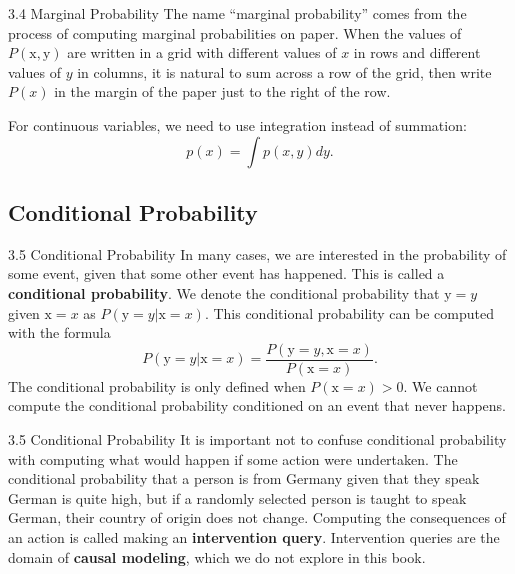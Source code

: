 \begin{frame}{3.4 Marginal Probability}
    \justifying
    The name ``marginal probability'' comes from the process of computing marginal probabilities on paper. When the values of $P(\mathrm{x}, \mathrm{y})$ are written in a grid with different values of $x$ in rows and different values of $y$ in columns, it is natural to sum across a row of the grid, then write $P(x)$ in the margin of the paper just to the right of the row.
    
    For continuous variables, we need to use integration instead of summation:
    \begin{equation}
        p(x) = \int p(x, y)dy.
        \label{eq:3_4}
    \end{equation}
\end{frame}

\subsection{Conditional Probability}
\begin{frame}{3.5 Conditional Probability}
    \justifying
    In many cases, we are interested in the probability of some event, given that some other event has happened. This is called a \textbf{conditional probability}. We denote the conditional probability that $\mathrm{y} = y$ given $\mathrm{x} = x$ as $P(\mathrm{y} = y | \mathrm{x} = x)$. This conditional probability can be computed with the formula
    \begin{equation}
        P(\mathrm{y} = y | \mathrm{x} = x) = \frac{P(\mathrm{y} = y, \mathrm{x} = x)}{P(\mathrm{x} = x)}.
        \label{eq:3_5}
    \end{equation}
    The conditional probability is only defined when $P(\mathrm{x} = x) > 0$. We cannot compute the conditional probability conditioned on an event that never happens.
\end{frame}

\begin{frame}{3.5 Conditional Probability}
    \justifying
    It is important not to confuse conditional probability with computing what would happen if some action were undertaken. The conditional probability that a person is from Germany given that they speak German is quite high, but if a randomly selected person is taught to speak German, their country of origin does not change. Computing the consequences of an action is called making an \textbf{intervention query}. Intervention queries are the domain of \textbf{causal modeling}, which we do not explore in this book.
\end{frame}{}

